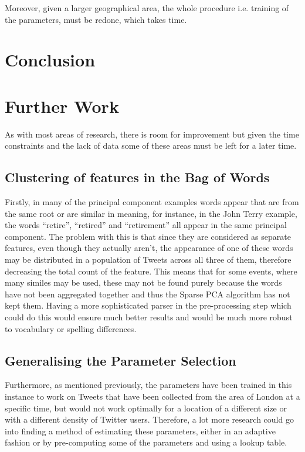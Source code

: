 \documentclass[11pt,a4paper]{article}
\begin{document}
Moreover, given a larger geographical area, the whole procedure i.e. training of the parameters, must be redone, which takes time. 


\clearpage
\section{Conclusion}
\section{Further Work}

As with most areas of research, there is room for improvement but given the time constraints and the lack of data some of these areas must be left for a later time. 

\subsection{Clustering of features in the Bag of Words}
Firstly, in many of the principal component examples words appear that are from the same root or are similar in meaning, for instance, in the John Terry example, the words ``retire'', ``retired'' and ``retirement'' all appear in the same principal component. The problem with this is that since they are considered as separate features, even though they actually aren't, the appearance of one of these words may be distributed in a population of Tweets across all three of them, therefore decreasing the total count of the feature. This means that for some events, where many similes may be used, these may not be found purely because the words have not been aggregated together and thus the Sparse PCA algorithm has not kept them. Having a more sophisticated parser in the pre-processing step which could do this would ensure much better results and would be much more robust to vocabulary or spelling differences.

\subsection{Generalising the Parameter Selection}
Furthermore, as mentioned previously, the parameters have been trained in this instance to work on Tweets that have been collected from the area of London at a specific time, but would not work optimally for a location of a different size or with a different density of Twitter users. Therefore, a lot more research could go into finding a method of estimating these parameters, either in an adaptive fashion or by pre-computing some of the parameters and using a lookup table.
\end{document}
